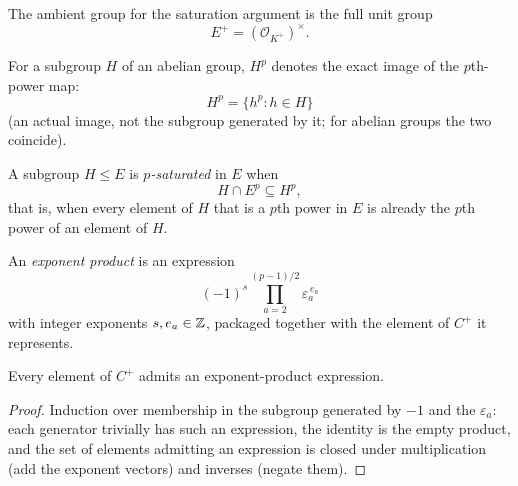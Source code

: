\begin{definition}\label{def:EPlus}
  \leanok
The ambient group for the saturation argument is the full unit group
\[
  E^+ = (\mathcal O_{K^+})^\times .
\]
\end{definition}

\begin{definition}\label{def:pPowerSubgroup}
  \leanok
For a subgroup $H$ of an abelian group, $H^p$ denotes the exact image of
the $p$th-power map:
\[
  H^p=\{h^p:h\in H\}
\]
(an actual image, not the subgroup generated by it; for abelian groups the
two coincide).
\end{definition}

\begin{definition}\label{def:pSaturated}
  \leanok
A subgroup $H\le E$ is \emph{$p$-saturated} in $E$ when
\[
  H\cap E^p\subseteq H^p,
\]
that is, when every element of $H$ that is a $p$th power in $E$ is already
the $p$th power of an element of $H$.
\end{definition}

\begin{definition}\label{def:CPlusExponentProduct}
  \leanok
An \emph{exponent product} is an expression
\[
  (-1)^s\prod_{a=2}^{(p-1)/2}\varepsilon_a^{\,e_a}
\]
with integer exponents $s, e_a \in \mathbb{Z}$, packaged together with the element
of $C^+$ it represents.
\end{definition}

\begin{theorem}\label{thm:exists-CPlusExponentProduct}
  \leanok
Every element of $C^+$ admits an exponent-product expression.
\end{theorem}
\begin{proof}\leanok
Induction over membership in the subgroup generated by $-1$ and the
$\varepsilon_a$: each generator trivially has such an expression, the
identity is the empty product, and the set of elements admitting an
expression is closed under multiplication (add the exponent vectors) and
inverses (negate them).
\end{proof}

